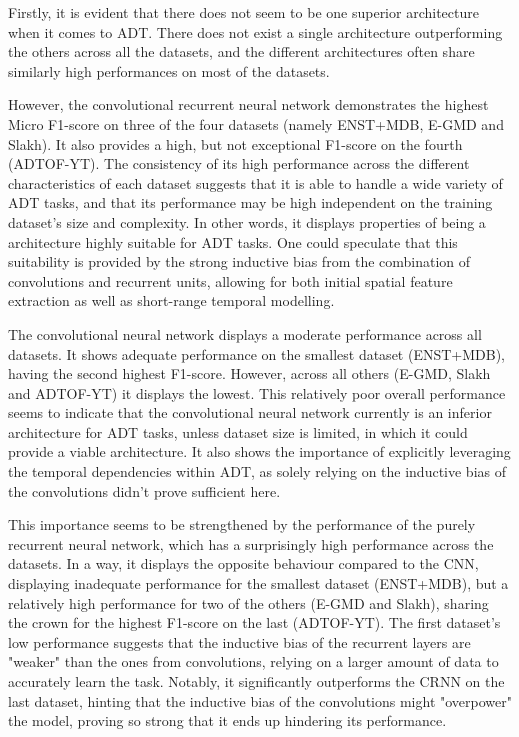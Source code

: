 Firstly, it is evident that there does not seem to be one superior architecture when it comes to \gls{ADT}. There does not exist a single architecture outperforming the others across all the datasets, and the different architectures often share similarly high performances on most of the datasets. 

However, the convolutional recurrent neural network demonstrates the highest Micro F1-score on three of the four datasets (namely ENST+MDB, E-GMD and Slakh). It also provides a high, but not exceptional F1-score on the fourth (ADTOF-YT). The consistency of its high performance across the different characteristics of each dataset suggests that it is able to handle a wide variety of \gls{ADT} tasks, and that its performance may be high independent on the training dataset's size and complexity. In other words, it displays properties of being a architecture highly suitable for \gls{ADT} tasks. One could speculate that this suitability is provided by the strong inductive bias from the combination of convolutions and recurrent units, allowing for both initial spatial feature extraction as well as short-range temporal modelling.

The convolutional neural network displays a moderate performance across all datasets. It shows adequate performance on the smallest dataset (ENST+MDB), having the second highest F1-score. However, across all others (E-GMD, Slakh and ADTOF-YT) it displays the lowest. This relatively poor overall performance seems to indicate that the convolutional neural network currently is an inferior architecture for \gls{ADT} tasks, unless dataset size is limited, in which it could provide a viable architecture. It also shows the importance of explicitly leveraging the temporal dependencies within \gls{ADT}, as solely relying on the inductive bias of the convolutions didn't prove sufficient here.

This importance seems to be strengthened by the performance of the purely recurrent neural network, which has a surprisingly high performance across the datasets. In a way, it displays the opposite behaviour compared to the \gls{CNN}, displaying inadequate performance for the smallest dataset (ENST+MDB), but a relatively high performance for two of the others (E-GMD and Slakh), sharing the crown for the highest F1-score on the last (ADTOF-YT). The first dataset's low performance suggests that the inductive bias of the recurrent layers are "weaker" than the ones from convolutions, relying on a larger amount of data to accurately learn the task. Notably, it significantly outperforms the \gls{CRNN} on the last dataset, hinting that the inductive bias of the convolutions might "overpower" the model, proving so strong that it ends up hindering its performance.

